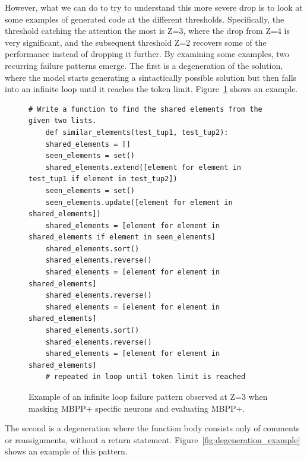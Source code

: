 \documentclass[mscthesis]{usiinfthesis}
\begin{document}
\begin{table}[h]
\centering
\caption{Qwen3.5-2B: MBPP+ accuracy when masking MBPP+ specific neurons.}
\label{tab:qwen35_mbpp_on_mbpp}
\end{table}
However, what we can do to try to understand this more severe drop is to look at some examples of generated code at the different thresholds.
Specifically, the threshold catching the attention the most is Z=3, where the drop from Z=4 is very significant, and the subsequent threshold Z=2 recovers some of the performance instead of dropping it further.
By examining some examples, two recurring failure patterns emerge.
The first is a degeneration of the solution, where the model starts generating a sintactically possible solution but then falls into an infinite loop until it reaches the token limit.
Figure~\ref{fig:infinite_loop_example} shows an example.

\begin{figure}[h]
\begin{lstlisting}[style=pythonstyle2]
    # Write a function to find the shared elements from the given two lists.
    def similar_elements(test_tup1, test_tup2):
	shared_elements = []
	seen_elements = set()
	shared_elements.extend([element for element in test_tup1 if element in test_tup2])
	seen_elements = set()
	seen_elements.update([element for element in shared_elements])
	shared_elements = [element for element in shared_elements if element in seen_elements]
	shared_elements.sort()
	shared_elements.reverse()
	shared_elements = [element for element in shared_elements]
	shared_elements.reverse()
	shared_elements = [element for element in shared_elements]
	shared_elements.sort()
	shared_elements.reverse()
	shared_elements = [element for element in shared_elements]
	# repeated in loop until token limit is reached
\end{lstlisting}
\caption{Example of an infinite loop failure pattern observed at Z=3 when masking MBPP+ specific neurons and evaluating MBPP+.}
\label{fig:infinite_loop_example}
\end{figure}
The second is a degeneration where the function body consists only of comments or reassignments, without a return statement.
Figure~\ref{fig:degeneration_example} shows an example of this pattern.
\end{document}
